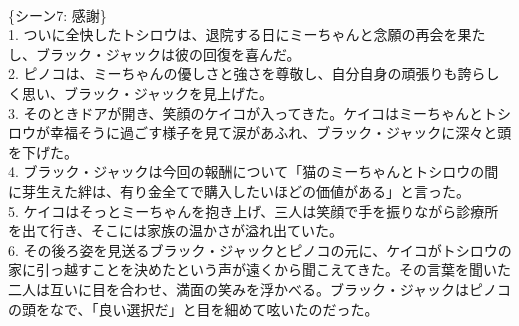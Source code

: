 \documentclass[a4j,12pt]{jsreport}
\begin{document}
\begin{breakitembox}
   \\
   \{シーン7: 感謝\}\\
   1. ついに全快したトシロウは、退院する日にミーちゃんと念願の再会を果たし、ブラック・ジャックは彼の回復を喜んだ。\\
   2. ピノコは、ミーちゃんの優しさと強さを尊敬し、自分自身の頑張りも誇らしく思い、ブラック・ジャックを見上げた。\\
   3. そのときドアが開き、笑顔のケイコが入ってきた。ケイコはミーちゃんとトシロウが幸福そうに過ごす様子を見て涙があふれ、ブラック・ジャックに深々と頭を下げた。\\
   4. ブラック・ジャックは今回の報酬について「猫のミーちゃんとトシロウの間に芽生えた絆は、有り金全てで購入したいほどの価値がある」と言った。\\
   5. ケイコはそっとミーちゃんを抱き上げ、三人は笑顔で手を振りながら診療所を出て行き、そこには家族の温かさが溢れ出ていた。\\
   6. その後ろ姿を見送るブラック・ジャックとピノコの元に、ケイコがトシロウの家に引っ越すことを決めたという声が遠くから聞こえてきた。その言葉を聞いた二人は互いに目を合わせ、満面の笑みを浮かべる。ブラック・ジャックはピノコの頭をなで、「良い選択だ」と目を細めて呟いたのだった。
   
\end{breakitembox}
\end{document}
